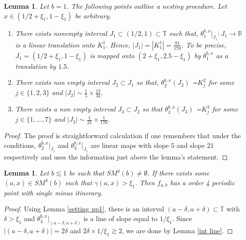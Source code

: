 \documentclass[12pt]{amsart}
\numberwithin{equation}{section}
\newtheorem{lemma}[theorem]{Lemma}
\theoremstyle{remark}
\begin{document}
\begin{lemma}\label{nest}
Let $b=1$. The following points outline a nesting procedure. Let $x \in (1/2+\xi_1,1-\xi_1)$ be arbitrary.
\begin{enumerate}
    \item There exists nonempty interval $J_1 \subset (1/2,1) \subset \mathbb{T}$ such that, $\theta_1^{b,x}|_{J_1}: J_1 \to \mathbb{R}$ is a linear translation onto $K^1_{1}$.  Hence, $|J_1|=|K^1_{1}| = \tfrac{81}{170}$.
     To be precise, $J_1=(1/2+\xi_1, 1-\xi_1)$ is mapped onto $(2+\xi_1,2.5-\xi_1)$ by $\theta_1^{b,x}$ as a translation by $1.5$.
    \item  There exists non empty interval $J_2 \subset J_1$ so that, $\theta_2^{b,x}(J_2)$ =$K_{j}^2$ for some $j \in \{1,2,3\}$ and $|J_2| \sim \tfrac{1}{5} \times \tfrac{13}{34}.$
    \item There exists a non empty interval $J_3 \subset J_2$ so that $\theta_3^{b,x}(J_3)$ =$K_{j}^3$ for some $j \in \{1,...,7\}$ and $|J_3| \sim \tfrac{1}{21} \times \tfrac{1}{170}.$
\end{enumerate} 

\end{lemma}
\begin{proof}
    The proof is straightforward calculation if one remembers that under the conditions, $\theta_2^{b,x}|_{J_1}$ and $\theta_3^{b,x}|_{J_1} $ are  linear maps with slope $5$ and slope $ 21$ respectively and uses the information just above the lemma's statement.
\end{proof}







\begin{lemma}\label{use int line}
     Let $b\lesssim 1$ be such that $SM^4(b) \neq \emptyset$.
    If there exists some $(a,x) \in SM^4(b)$ such that $\gamma(a,x)> \xi_1$. Then $f_{a,b}$  has a order 4 periodic point with single minus itinerary.
    
\end{lemma}
\begin{proof}
 Using Lemma \ref{setting up1}, there is an interval $(a-\delta,a+\delta)\subset\mathbb{T}$ with $\delta>\xi_1$ and  $\theta_4^{b,x}|_{(a-\delta,a+\delta)}$ is a line of slope equal to $1/\xi_1$. Since $|(a-\delta,a+\delta)|=2\delta$ and $2\delta \times 1/\xi_1 \gtrsim 2 $, we are done by Lemma \ref{int line}. 
\end{proof}
\end{document}
